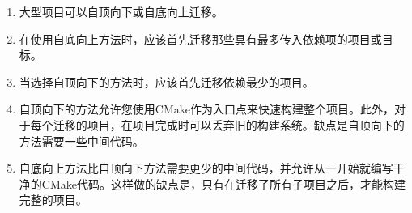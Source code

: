 

\begin{enumerate}
\item 
大型项目可以自顶向下或自底向上迁移。

\item
在使用自底向上方法时，应该首先迁移那些具有最多传入依赖项的项目或目标。

\item 
当选择自顶向下的方法时，应该首先迁移依赖最少的项目。

\item 
自顶向下的方法允许您使用CMake作为入口点来快速构建整个项目。此外，对于每个迁移的项目，在项目完成时可以丢弃旧的构建系统。缺点是自顶向下的方法需要一些中间代码。

\item 
自底向上方法比自顶向下方法需要更少的中间代码，并允许从一开始就编写干净的CMake代码。这样做的缺点是，只有在迁移了所有子项目之后，才能构建完整的项目。
\end{enumerate}
